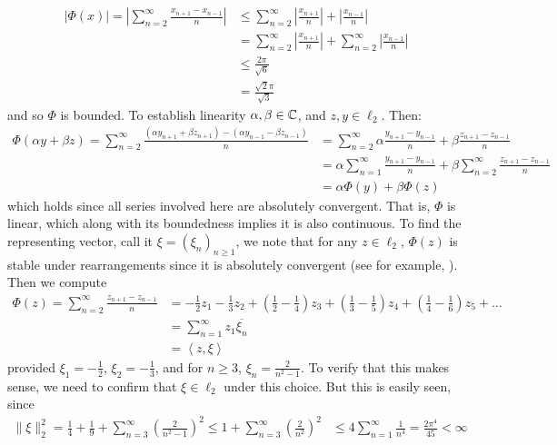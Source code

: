 \documentclass[10pt]{article}
\newcommand{\1}[1]{\mathbbm{1}_{#1}} \newcommand{\mc}[1]{\mathcal{#1}}
\newcommand{\ip}[2]{\left\langle#1,#2\right\rangle }
\begin{document}
    \begin{align*}
        |\Phi(x)|=\left|\sum_{n=2}^\infty\frac{x_{n+1}-x_{n-1}}{n}\right|&\leq\sum_{n=2}^\infty\left|\frac{x_{n+1}}{n}\right|+\left|\frac{x_{n-1}}{n}\right|\\
        &=\sum_{n=2}^\infty\left|\frac{x_{n+1}}{n}\right|+\sum_{n=2}^\infty\left|\frac{x_{n-1}}{n}\right|\tag{6}\\
        &\leq\frac{2\pi}{\sqrt{6}}\\
        &=\frac{\sqrt{2}\pi}{\sqrt{3}}
    \end{align*}
    and so $\Phi$ is bounded. To establish linearity $\alpha,\beta\in\mathbb{C}$, and $z,y\in\ell_2$. Then:
    \begin{align*}
        \Phi(\alpha y+\beta z)=\sum_{n=2}^\infty\frac{(\alpha y_{n+1}+\beta z_{n+1})-(\alpha y_{n-1}-\beta z_{n-1})}{n}&=\sum_{n=2}^\infty\alpha\frac{y_{n+1}-y_{n-1}}{n}+\beta\frac{z_{n+1}-z_{n-1}}{n}\\
        &=\alpha\sum_{n=1}^\infty\frac{y_{n+1}-y_{n-1}}{n}+\beta\sum_{n=2}^\infty\frac{z_{n+1}-z_{n-1}}{n}\\
        &=\alpha\Phi(y)+\beta\Phi(z)
    \end{align*}
    which holds since all series involved here are absolutely convergent. That is, $\Phi$ is linear, which along with its boundedness implies it is also continuous. To find the representing vector, call it $\xi=(\xi_n)_{n\geq 1}$, we note that for any $z\in\ell_2$, $\Phi(z)$ is stable under rearrangements
    since it is absolutely convergent (see for example, \cite[p.78, theorem 3.55]{Rudin_1976}). Then we compute
    \begin{align*}
        \Phi(z)=\sum_{n=2}^\infty\frac{z_{n+1}-z_{n-1}}{n}&=-\frac{1}{2}z_1-\frac{1}{3}z_2+\left(\frac{1}{2}-\frac{1}{4}\right)z_3+\left(\frac{1}{3}-\frac{1}{5}\right)z_4+\left(\frac{1}{4}-\frac{1}{6}\right)z_5+\dots\\
        &=\sum_{n=1}^\infty z_1\overline{\xi_n}\\
        &=\ip{z}{\xi}
    \end{align*}
    provided $\xi_1=-\frac{1}{2}$, $\xi_2=-\frac{1}{3}$, and for $n\geq 3$, $\xi_n=\frac{2}{n^2-1}$. To verify that this makes sense, we need to confirm that $\xi\in\ell_2$ under this choice. But this is easily seen, since
    \begin{align*}
        \|\xi\|_2^2=\frac{1}{4}+\frac{1}{9}+\sum_{n=3}^\infty\left(\frac{2}{n^2-1}\right)^2\leq 1+\sum_{n=3}^\infty\left(\frac{2}{n^2}\right)^2&\leq4\sum_{n=1}^\infty\frac{1}{n^4}=\frac{2\pi^4}{45}<\infty
    \end{align*}
\end{document}
